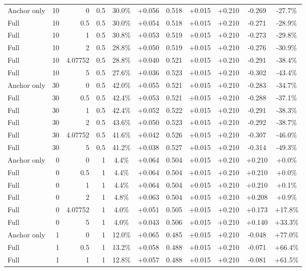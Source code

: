 \begin{table}[htbp]
\begin{tabular}{lrrrccccccc}
Anchor only & 10 & 0 & 0.5 & 30.0\% & +0.056 & 0.518 & +0.015 & +0.210 & -0.269 & -27.7\% \\
Full & 10 & 0.5 & 0.5 & 30.0\% & +0.054 & 0.518 & +0.015 & +0.210 & -0.271 & -28.9\% \\
Full & 10 & 1 & 0.5 & 30.8\% & +0.053 & 0.519 & +0.015 & +0.210 & -0.273 & -29.8\% \\
Full & 10 & 2 & 0.5 & 28.8\% & +0.050 & 0.519 & +0.015 & +0.210 & -0.276 & -30.9\% \\
Full & 10 & 4.07752 & 0.5 & 28.8\% & +0.040 & 0.521 & +0.015 & +0.210 & -0.291 & -38.4\% \\
Full & 10 & 5 & 0.5 & 27.6\% & +0.036 & 0.523 & +0.015 & +0.210 & -0.302 & -43.4\% \\
Anchor only & 30 & 0 & 0.5 & 42.0\% & +0.055 & 0.521 & +0.015 & +0.210 & -0.283 & -34.7\% \\
Full & 30 & 0.5 & 0.5 & 42.4\% & +0.053 & 0.521 & +0.015 & +0.210 & -0.288 & -37.1\% \\
Full & 30 & 1 & 0.5 & 42.4\% & +0.052 & 0.522 & +0.015 & +0.210 & -0.291 & -38.3\% \\
Full & 30 & 2 & 0.5 & 43.6\% & +0.050 & 0.523 & +0.015 & +0.210 & -0.292 & -38.7\% \\
Full & 30 & 4.07752 & 0.5 & 41.6\% & +0.042 & 0.526 & +0.015 & +0.210 & -0.307 & -46.0\% \\
Full & 30 & 5 & 0.5 & 41.2\% & +0.038 & 0.527 & +0.015 & +0.210 & -0.314 & -49.3\% \\
Anchor only & 0 & 0 & 1 & 4.4\% & +0.064 & 0.504 & +0.015 & +0.210 & +0.210 & +0.0\% \\
Full & 0 & 0.5 & 1 & 4.4\% & +0.064 & 0.504 & +0.015 & +0.210 & +0.210 & +0.0\% \\
Full & 0 & 1 & 1 & 4.4\% & +0.064 & 0.504 & +0.015 & +0.210 & +0.210 & +0.1\% \\
Full & 0 & 2 & 1 & 4.8\% & +0.063 & 0.504 & +0.015 & +0.210 & +0.208 & +0.9\% \\
Full & 0 & 4.07752 & 1 & 4.0\% & +0.051 & 0.505 & +0.015 & +0.210 & +0.173 & +17.8\% \\
Full & 0 & 5 & 1 & 4.0\% & +0.043 & 0.506 & +0.015 & +0.210 & +0.140 & +33.3\% \\
Anchor only & 1 & 0 & 1 & 12.0\% & +0.065 & 0.485 & +0.015 & +0.210 & -0.048 & +77.0\% \\
Full & 1 & 0.5 & 1 & 13.2\% & +0.058 & 0.488 & +0.015 & +0.210 & -0.071 & +66.4\% \\
Full & 1 & 1 & 1 & 12.8\% & +0.057 & 0.488 & +0.015 & +0.210 & -0.081 & +61.5\% \\

\end{tabular}
\end{table}
